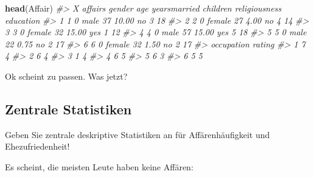 \documentclass[12pt,ngerman,]{book}
\makeatletter
\newenvironment{Shaded}{\begin{snugshade}}{\end{snugshade}}
\newcommand{\KeywordTok}[1]{\textcolor[rgb]{0.13,0.29,0.53}{\textbf{{#1}}}}
\newcommand{\DataTypeTok}[1]{\textcolor[rgb]{0.13,0.29,0.53}{{#1}}}
\newcommand{\CommentTok}[1]{\textcolor[rgb]{0.56,0.35,0.01}{\textit{{#1}}}}
\newcommand{\NormalTok}[1]{{#1}}
\newenvironment{kframe}{%
\medskip{}
\setlength{\fboxsep}{.8em}
 \def\at@end@of@kframe{}%
 \ifinner\ifhmode%
  \def\at@end@of@kframe{\end{minipage}}%
  \begin{minipage}{\columnwidth}%
 \fi\fi%
 \def\FrameCommand##1{\hskip\@totalleftmargin \hskip-\fboxsep
 \colorbox{shadecolor}{##1}\hskip-\fboxsep
     \hskip-\linewidth \hskip-\@totalleftmargin \hskip\columnwidth}%
 \MakeFramed {\advance\hsize-\width
   \@totalleftmargin\z@ \linewidth\hsize
   \@setminipage}}%
 {\par\unskip\endMakeFramed%
 \at@end@of@kframe}
\renewenvironment{Shaded}{\begin{kframe}}{\end{kframe}}
\makeatother
\begin{document}
\begin{Shaded}
\begin{Highlighting}[]
\KeywordTok{head}\NormalTok{(Affair)}
\CommentTok{#>   X affairs gender age yearsmarried children religiousness education}
\CommentTok{#> 1 1       0   male  37        10.00       no             3        18}
\CommentTok{#> 2 2       0 female  27         4.00       no             4        14}
\CommentTok{#> 3 3       0 female  32        15.00      yes             1        12}
\CommentTok{#> 4 4       0   male  57        15.00      yes             5        18}
\CommentTok{#> 5 5       0   male  22         0.75       no             2        17}
\CommentTok{#> 6 6       0 female  32         1.50       no             2        17}
\CommentTok{#>   occupation rating}
\CommentTok{#> 1          7      4}
\CommentTok{#> 2          6      4}
\CommentTok{#> 3          1      4}
\CommentTok{#> 4          6      5}
\CommentTok{#> 5          6      3}
\CommentTok{#> 6          5      5}
\end{Highlighting}
\end{Shaded}

Ok scheint zu passen. Was jetzt?

\subsection{Zentrale Statistiken}\label{zentrale-statistiken}

Geben Sie zentrale deskriptive Statistiken an für Affärenhäufigkeit und
Ehezufriedenheit!

\begin{Shaded}
\end{Shaded}

Es scheint, die meisten Leute haben keine Affären:

\begin{Shaded}
\end{Shaded}
\end{document}
